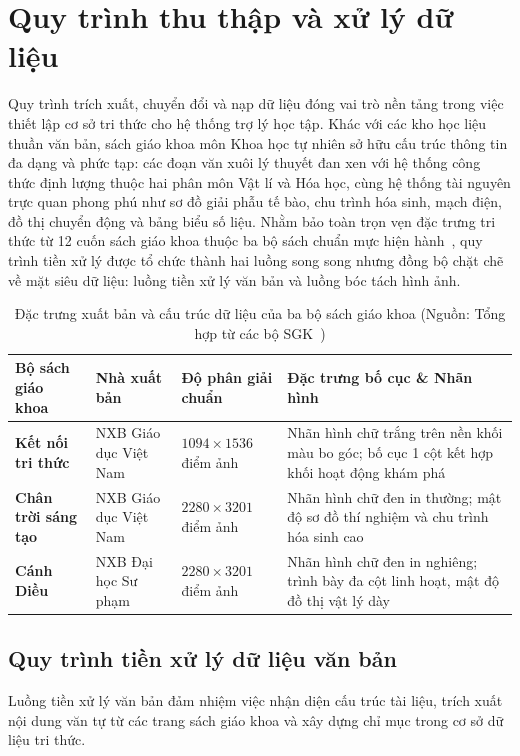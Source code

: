 \section{Quy trình thu thập và xử lý dữ liệu}
Quy trình trích xuất, chuyển đổi và nạp dữ liệu đóng vai trò nền tảng trong việc thiết lập cơ sở tri thức cho hệ thống trợ lý học tập. Khác với các kho học liệu thuần văn bản, sách giáo khoa môn Khoa học tự nhiên sở hữu cấu trúc thông tin đa dạng và phức tạp: các đoạn văn xuôi lý thuyết đan xen với hệ thống công thức định lượng thuộc hai phân môn Vật lí và Hóa học, cùng hệ thống tài nguyên trực quan phong phú như sơ đồ giải phẫu tế bào, chu trình hóa sinh, mạch điện, đồ thị chuyển động và bảng biểu số liệu. Nhằm bảo toàn trọn vẹn đặc trưng tri thức từ 12 cuốn sách giáo khoa thuộc ba bộ sách chuẩn mực hiện hành~\cite{sgk_kntt6, sgk_kntt7, sgk_kntt8, sgk_kntt9, sgk_ctst6, sgk_ctst7, sgk_ctst8, sgk_ctst9, sgk_cd6, sgk_cd7, sgk_cd8, sgk_cd9}, quy trình tiền xử lý được tổ chức thành hai luồng song song nhưng đồng bộ chặt chẽ về mặt siêu dữ liệu: luồng tiền xử lý văn bản và luồng bóc tách hình ảnh.

\begin{table}[H]
\centering
\caption{Đặc trưng xuất bản và cấu trúc dữ liệu của ba bộ sách giáo khoa (Nguồn: Tổng hợp từ các bộ SGK~\cite{sgk_kntt6, sgk_ctst6, sgk_cd6})}
\label{tab:sgk_features}
\small
\begin{tabular}{lp{3.5cm}p{3.2cm}p{4cm}}
\toprule
\textbf{Bộ sách giáo khoa} & \textbf{Nhà xuất bản} & \textbf{Độ phân giải chuẩn} & \textbf{Đặc trưng bố cục \& Nhãn hình} \\
\midrule
\textbf{Kết nối tri thức} & NXB Giáo dục Việt Nam & $1094 \times 1536$ điểm ảnh & Nhãn hình chữ trắng trên nền khối màu bo góc; bố cục 1 cột kết hợp khối hoạt động khám phá \\
\textbf{Chân trời sáng tạo} & NXB Giáo dục Việt Nam & $2280 \times 3201$ điểm ảnh & Nhãn hình chữ đen in thường; mật độ sơ đồ thí nghiệm và chu trình hóa sinh cao \\
\textbf{Cánh Diều} & NXB Đại học Sư phạm & $2280 \times 3201$ điểm ảnh & Nhãn hình chữ đen in nghiêng; trình bày đa cột linh hoạt, mật độ đồ thị vật lý dày \\
\bottomrule
\end{tabular}
\end{table}

\subsection{Quy trình tiền xử lý dữ liệu văn bản}
Luồng tiền xử lý văn bản đảm nhiệm việc nhận diện cấu trúc tài liệu, trích xuất nội dung văn tự từ các trang sách giáo khoa và xây dựng chỉ mục trong cơ sở dữ liệu tri thức.

